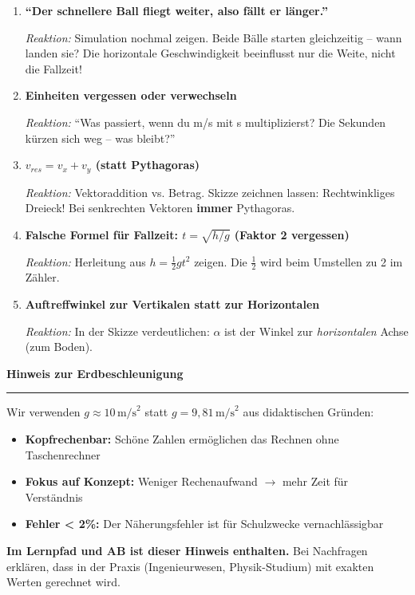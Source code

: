\documentclass[11pt, a4paper]{article}
\newcommand{\fachfarbe}{physik}
\newcommand{\abschnitt}[1]{%
    \vspace{12pt}
    \noindent\textbf{\large\textcolor{\fachfarbe}{#1}}
    \vspace{6pt}
    \hrule
    \vspace{8pt}
}
\begin{document}
\begin{errorbox}
\begin{enumerate}
    \item \textbf{``Der schnellere Ball fliegt weiter, also fällt er länger.''}

    \textit{Reaktion:} Simulation nochmal zeigen. Beide Bälle starten gleichzeitig -- wann landen sie? Die horizontale Geschwindigkeit beeinflusst nur die Weite, nicht die Fallzeit!

    \item \textbf{Einheiten vergessen oder verwechseln}

    \textit{Reaktion:} ``Was passiert, wenn du m/s mit s multiplizierst? Die Sekunden kürzen sich weg -- was bleibt?''

    \item \textbf{$v_{res} = v_x + v_y$ (statt Pythagoras)}

    \textit{Reaktion:} Vektoraddition vs. Betrag. Skizze zeichnen lassen: Rechtwinkliges Dreieck! Bei senkrechten Vektoren \textbf{immer} Pythagoras.

    \item \textbf{Falsche Formel für Fallzeit: $t = \sqrt{h/g}$ (Faktor 2 vergessen)}

    \textit{Reaktion:} Herleitung aus $h = \frac{1}{2}gt^2$ zeigen. Die $\frac{1}{2}$ wird beim Umstellen zu 2 im Zähler.

    \item \textbf{Auftreffwinkel zur Vertikalen statt zur Horizontalen}

    \textit{Reaktion:} In der Skizze verdeutlichen: $\alpha$ ist der Winkel zur \textit{horizontalen} Achse (zum Boden).
\end{enumerate}
\end{errorbox}


\abschnitt{Hinweis zur Erdbeschleunigung}

\begin{infobox}
Wir verwenden $g \approx 10\,\text{m/s}^2$ statt $g = 9{,}81\,\text{m/s}^2$ aus didaktischen Gründen:

\begin{itemize}
    \item \textbf{Kopfrechenbar:} Schöne Zahlen ermöglichen das Rechnen ohne Taschenrechner
    \item \textbf{Fokus auf Konzept:} Weniger Rechenaufwand $\rightarrow$ mehr Zeit für Verständnis
    \item \textbf{Fehler < 2\%:} Der Näherungsfehler ist für Schulzwecke vernachlässigbar
\end{itemize}

\textbf{Im Lernpfad und AB ist dieser Hinweis enthalten.} Bei Nachfragen erklären, dass in der Praxis (Ingenieurwesen, Physik-Studium) mit exakten Werten gerechnet wird.
\end{infobox}
\end{document}
